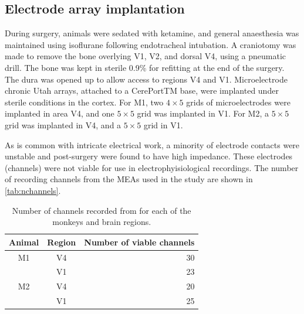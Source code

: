 \subsection{Electrode array implantation}

During surgery, animals were sedated with ketamine, and general anaesthesia was maintained using isoflurane following endotracheal intubation.
A craniotomy was made to remove the bone overlying \ac{V1}, V2, and dorsal \ac{V4}, using a pneumatic drill.
The bone was kept in sterile 0.9\%  for refitting at the end of the surgery.
The dura was opened up to allow access to regions \ac{V4} and \ac{V1}.
Microelectrode chronic Utah arrays, attached to a CerePortTM base, were implanted under sterile conditions in the cortex.
For \ac{M1}, two $4{\times}5$ grids of microelectrodes were implanted in area \ac{V4}, and one $5{\times}5$ grid was implanted in \ac{V1}.
For \ac{M2}, a $5{\times}5$ grid was implanted in \ac{V4}, and a $5{\times}5$ grid in \ac{V1}.

As is common with intricate electrical work, a minority of electrode contacts were unstable and post-surgery were found to have high impedance.
These electrodes (channels) were not viable for use in electrophyisiological recordings.
The number of recording channels from the \acp{MEA} used in the study are shown in \autoref{tab:nchannels}.

\begin{table}[bthp]
\caption{Number of channels recorded from for each of the monkeys and brain regions.}
\label{tab:nchannels}
\begin{center}
\begin{tabular}{ccr}
\toprule
Animal  & Region    & Number of viable channels \\
\midrule
M1      & V4        & 30 \\
        & V1        & 23 \\
M2      & V4        & 20 \\
        & V1        & 25 \\
\bottomrule
\end{tabular}
\end{center}
\end{table}


